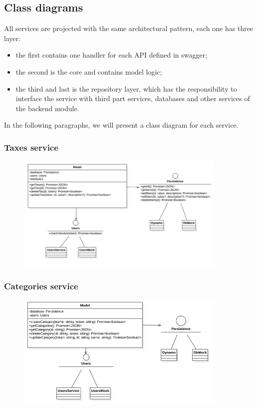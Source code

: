 \subsection{Class diagrams}
All services are projected with the same architectural pattern, each one has three layer:
\begin{itemize}
    \item the first contains one handler for each API defined in swagger;
    \item the second is the core and contains model logic;
    \item the third and last is the repository layer, which has the responsibility to interface the
          service with third part services, databases and other services of the backend module.
\end{itemize}
In the following paragraphs, we will present a class diagram for each service.

\subsubsection{Taxes service}
\begin{figure}[H]
    \includegraphics[width=0.9\textwidth]{res/images/class-diagrams/taxes.png}
\end{figure}

\subsubsection{Categories service}
\begin{figure}[H]
    \includegraphics[width=0.9\textwidth]{res/images/class-diagrams/categories.png}
\end{figure}

